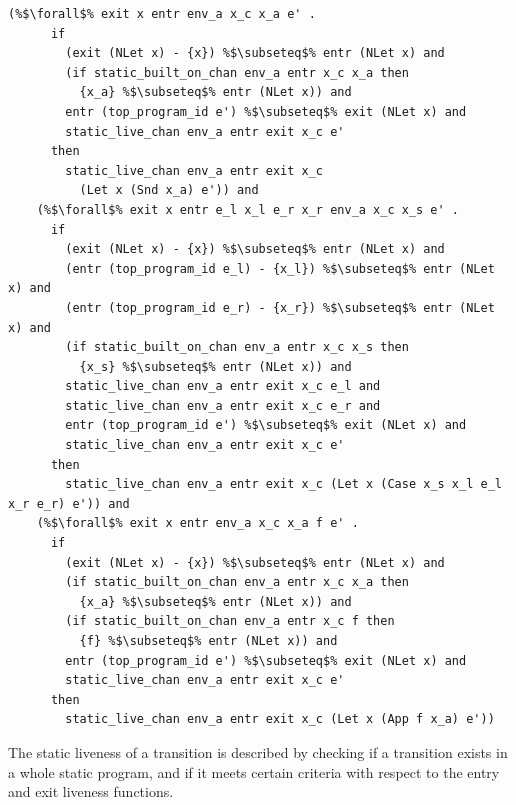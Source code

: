 \documentclass{article}
\begin{document}
\begin{lstlisting}[language=logic, escapechar=\%]
    (%$\forall$% exit x entr env_a x_c x_a e' .
      if 
        (exit (NLet x) - {x}) %$\subseteq$% entr (NLet x) and
        (if static_built_on_chan env_a entr x_c x_a then
          {x_a} %$\subseteq$% entr (NLet x)) and
        entr (top_program_id e') %$\subseteq$% exit (NLet x) and
        static_live_chan env_a entr exit x_c e'
      then
        static_live_chan env_a entr exit x_c
          (Let x (Snd x_a) e')) and
    (%$\forall$% exit x entr e_l x_l e_r x_r env_a x_c x_s e' .
      if 
        (exit (NLet x) - {x}) %$\subseteq$% entr (NLet x) and
        (entr (top_program_id e_l) - {x_l}) %$\subseteq$% entr (NLet x) and
        (entr (top_program_id e_r) - {x_r}) %$\subseteq$% entr (NLet x) and
        (if static_built_on_chan env_a entr x_c x_s then
          {x_s} %$\subseteq$% entr (NLet x)) and
        static_live_chan env_a entr exit x_c e_l and
        static_live_chan env_a entr exit x_c e_r and
        entr (top_program_id e') %$\subseteq$% exit (NLet x) and
        static_live_chan env_a entr exit x_c e'
      then 
        static_live_chan env_a entr exit x_c (Let x (Case x_s x_l e_l x_r e_r) e')) and
    (%$\forall$% exit x entr env_a x_c x_a f e' .
      if
        (exit (NLet x) - {x}) %$\subseteq$% entr (NLet x) and
        (if static_built_on_chan env_a entr x_c x_a then
          {x_a} %$\subseteq$% entr (NLet x)) and
        (if static_built_on_chan env_a entr x_c f then
          {f} %$\subseteq$% entr (NLet x)) and
        entr (top_program_id e') %$\subseteq$% exit (NLet x) and
        static_live_chan env_a entr exit x_c e'
      then
        static_live_chan env_a entr exit x_c (Let x (App f x_a) e'))
  \end{lstlisting}

The static liveness of a transition is described by checking if a transition exists in a whole
static program, and if it meets certain criteria with respect to the entry and exit liveness
functions. 
\end{document}
